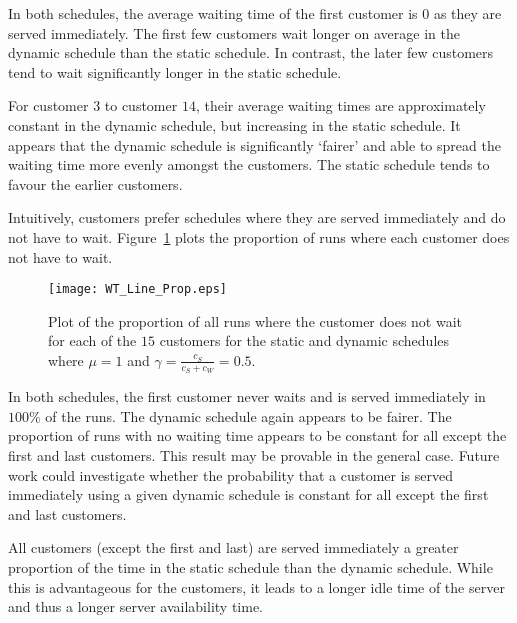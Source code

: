 In both schedules, the average waiting time of the first customer is $0$ as they are served immediately. The first few customers wait longer on average in the dynamic schedule than the static schedule. In contrast, the later few customers tend to wait significantly longer in the static schedule.

For customer $3$ to customer $14$, their average waiting times are approximately constant in the dynamic schedule, but increasing in the static schedule. It appears that the dynamic schedule is significantly `fairer' and able to spread the waiting time more evenly amongst the customers. The static schedule tends to favour the earlier customers.

Intuitively, customers prefer schedules where they are served immediately and do not have to wait. Figure~\ref{fig:No_Wait_Position} plots the proportion of runs where each customer does not have to wait.
\begin{figure}[htb]
	\centering
	\texttt{[image: WT\_Line\_Prop.eps]}
	\caption{Plot of the proportion of all runs where the customer does not wait for each of the $15$ customers for the static and dynamic schedules where $\mu = 1$ and $\gamma = \frac{c_{S}}{c_{S} + c_{W}} = 0.5$.}
	\label{fig:No_Wait_Position}
\end{figure}

In both schedules, the first customer never waits and is served immediately in $100 \%$ of the runs. The dynamic schedule again appears to be fairer. The proportion of runs with no waiting time appears to be constant for all except the first and last customers. This result may be provable in the general case. Future work could investigate whether the probability that a customer is served immediately using a given dynamic schedule is constant for all except the first and last customers.

All customers (except the first and last) are served immediately a greater proportion of the time in the static schedule than the dynamic schedule. While this is advantageous for the customers, it leads to a longer idle time of the server and thus a longer server availability time.

